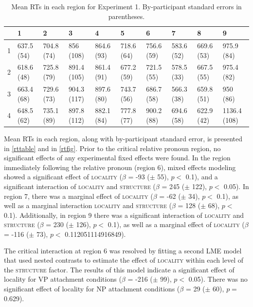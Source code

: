 \documentclass[12pt]{article}
\begin{document}
\begin{table}[ht]
\centering
{\scriptsize
\begin{tabularx}{\textwidth}{rlllllllll}
  \hline
 & 1 & 2 & 3 & 4 & 5 & 6 & 7 & 8 & 9 \\ 
  \hline
1 & 637.5 (54) & 704.8 (74) & 856 (108) & 864.6 (93) & 718.6 (64) & 756.6 (59) & 583.6 (52) & 669.6 (53) & 975.9 (84) \\ 
  2 & 618.6 (48) & 725.8 (79) & 891.4 (105) & 861.4 (91) & 677.2 (59) & 721.5 (55) & 578.5 (33) & 667.5 (55) & 975.4 (82) \\ 
  3 & 663.4 (68) & 729.6 (73) & 904.3 (117) & 897.6 (80) & 743.7 (56) & 686.7 (58) & 566.3 (38) & 659.8 (51) & 950 (86) \\ 
  4 & 648.5 (62) & 735.1 (89) & 897.8 (112) & 882.1 (84) & 777.8 (77) & 900.2 (88) & 694.6 (58) & 622.9 (42) & 1136.4 (108) \\ 
   \hline
\end{tabularx}
}
\caption{Mean RTs in each region for Experiment 1. By-participant standard errors in parentheses.} 
\end{table}
Mean RTs in each region, along with by-participant standard error, is presented in \ref{rttable} and in \ref{rtfig}. Prior to the critical relative pronoun region, no significant effects of any experimental fixed effects were found. In the region immediately following the relative pronoun (region 6), mixed effects modeling showed a significant effect of \textsc{locality} ($\beta$ = -93 ($\pm$ 55), $p <$ 0.1), and a significant interaction of \textsc{locality} and \textsc{structure} ($\beta$ = 245 ($\pm$ 122), $p <$ 0.05). In region 7, there was a marginal effect of \textsc{locality} ($\beta$ = -62 ($\pm$ 34), $p <$ 0.1), as well as a marginal interaction \textsc{locality} and \textsc{structure} ($\beta$ = 128 ($\pm$ 68), $p <$ 0.1). Additionally, in region 9 there was a significant interaction of \textsc{locality} and \textsc{structure} ($\beta$ = 230 ($\pm$ 126), $p <$ 0.1), as well as a marginal effect of \textsc{locality} ($\beta$ = -116 ($\pm$ 73), $p <$ 0.112051114916849).

The critical interaction at region 6 was resolved by fitting a second LME model that used nested contrasts to estimate the effect of \textsc{locality} within each level of the \textsc{structure} factor. The results of this model indicate a significant effect of locality for VP attachment conditions ($\beta$ = -216 ($\pm$ 99), $p <$ 0.05). There was no significant effect of locality for NP attachment conditions ($\beta$ = 29 ($\pm$ 60), $p =$ 0.629).
\end{document}
